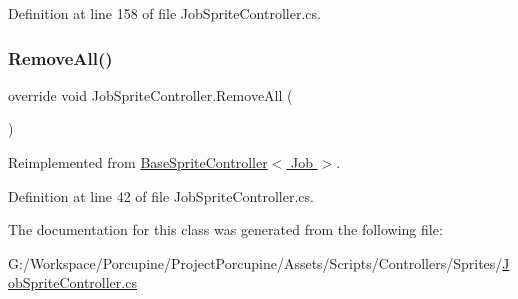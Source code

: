 Definition at line 158 of file Job\+Sprite\+Controller.\+cs.

\mbox{\label{class_job_sprite_controller_ae84f16c980f6376985c0752874dc28a4}} 
\subsubsection{\texorpdfstring{Remove\+All()}{RemoveAll()}}
{\footnotesize\ttfamily override void Job\+Sprite\+Controller.\+Remove\+All (\begin{DoxyParamCaption}{ }\end{DoxyParamCaption})\hspace{0.3cm}{\ttfamily [virtual]}}



Reimplemented from \hyperlink{class_base_sprite_controller_ae1fdf8c0abb1e362257540f2de80d6dc}{Base\+Sprite\+Controller$<$ Job $>$}.



Definition at line 42 of file Job\+Sprite\+Controller.\+cs.



The documentation for this class was generated from the following file\+:\begin{DoxyCompactItemize}
\item 
G\+:/\+Workspace/\+Porcupine/\+Project\+Porcupine/\+Assets/\+Scripts/\+Controllers/\+Sprites/\hyperlink{_job_sprite_controller_8cs}{Job\+Sprite\+Controller.\+cs}\end{DoxyCompactItemize}
